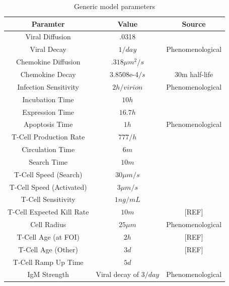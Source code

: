 \documentclass[10pt]{article}
\begin{document}
\begin{table}
\begin{center}
\begin{tabular}{ | c | c | c | }
  \hline                        
  Paramter & Value & Source \\
  \hline
  Viral Diffusion & .0318 & \cite{Beauchemin2006} \\
  Viral Decay &  $1/day$ & Phenomenological \\
  Chemokine Diffusion & $.318 \mu m^2/s$ & \cite{Beauchemin2006} \\
  Chemokine Decay &  $3.8508$e-4$/s$ & 30m half-life \\
  Infection Sensitivity &  $2 h/virion$ & Phenomenological \\
  Incubation Time &  $10 h$ & \cite{Mitchell2011} \\
  Expression Time &  $16.7 h$ & \cite{Mitchell2011} \\
  Apoptosis Time & $1 h$ & Phenomenological \\
  T-Cell Production Rate & $777/h$ & \cite{Miao2010} \\ 
  Circulation Time & $6 m$ & \cite{Banerjee2010b} \\
  Search Time & $10 m$ & \cite{Banerjee2010b} \\
  T-Cell Speed (Search) & $30 \mu m/s$ & \cite{Miller2003} \\
  T-Cell Speed (Activated) & $3 \mu m/s$ & \cite{Miller2003} \\
  T-Cell Sensitivity & $1 ng/mL$ & \cite{Gao2003} \\
  T-Cell Expected Kill Rate & $10 m$ & [REF] \\
  Cell Radius & $25 \mu m$ & Phenomenological \\
  T-Cell Age (at FOI) & $2 h$ & [REF] \\
  T-Cell Age (Other) & $3 d$ & [REF] \\
  T-Cell Ramp Up Time & $5 d$ & \cite{Banerjee2011} \\
  IgM Strength & Viral decay of $3/day$ & Phenomenological \\
  \hline  
\end{tabular}
\caption{Generic model parameters}
\label{table:parameters}
\end{center}
\end{table}
\end{document}
